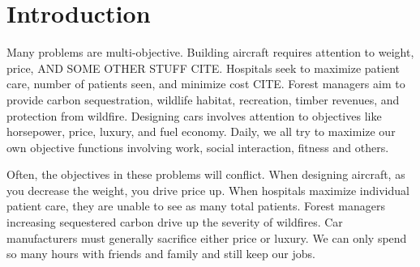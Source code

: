 
\section{Introduction}
\label{sec:intro}

Many problems are multi-objective. Building aircraft requires attention to weight, price, AND SOME OTHER STUFF CITE. Hospitals seek to maximize patient care, number of patients seen, and minimize cost CITE. Forest managers aim to provide carbon sequestration, wildlife habitat, recreation, timber revenues, and protection from wildfire. Designing cars involves attention to objectives like horsepower, price, luxury, and fuel economy. Daily, we all try to maximize our own objective functions involving work, social interaction, fitness and others.

Often, the objectives in these problems will conflict. When designing aircraft, as you decrease the weight, you drive price up. When hospitals maximize individual patient care, they are unable to see as many total patients. Forest managers increasing sequestered carbon drive up the severity of wildfires. Car manufacturers must generally sacrifice either price or luxury. We can only spend so many hours with friends and family and still keep our jobs.

